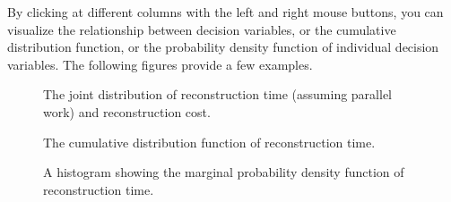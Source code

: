 By clicking at different columns with the left and right mouse buttons, you can visualize the relationship between decision variables, or the cumulative distribution function, or the probability density function of individual decision variables. The following figures provide a few examples.

\begin{figure}[!htbp]
  \caption{The joint distribution of reconstruction time (assuming parallel work) and reconstruction cost.}
  \label{fig:ex_1_RES_2}
\end{figure}

\begin{figure}[!htbp]
  \caption{The cumulative distribution function of reconstruction time.}
  \label{fig:ex_1_RES_3}
\end{figure}

\begin{figure}[!htbp]
  \caption{A histogram showing the marginal probability density function of reconstruction time.}
  \label{fig:ex_1_RES_4}
\end{figure}
